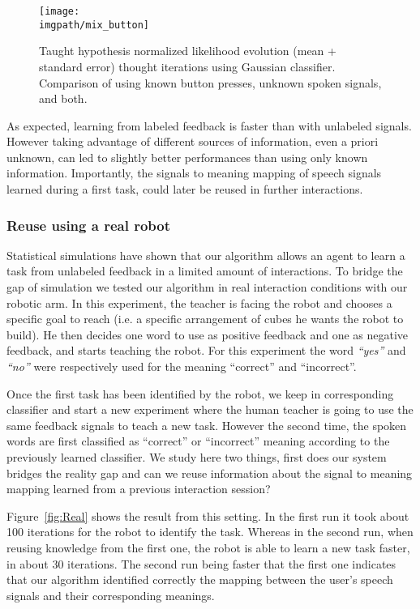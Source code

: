 \begin{figure}[!htbp]
  \centering
  \texttt{[image: \\imgpath/mix\_button]}
  \caption{Taught hypothesis normalized likelihood evolution (mean + standard error) thought iterations using Gaussian classifier. Comparison of using known button presses, unknown spoken signals, and both.}
  \label{fig:button}
\end{figure}

As expected, learning from labeled feedback is faster than with unlabeled signals. However taking advantage of different sources of information, even a priori unknown, can led to slightly better performances than using only known information. Importantly, the signals to meaning mapping of speech signals learned during a first task, could later be reused in further interactions.

\subsubsection{Reuse using a real robot}

Statistical simulations have shown that our algorithm allows an agent to learn a task from unlabeled feedback in a limited amount of interactions. To bridge the gap of simulation we tested our algorithm in real interaction conditions with our robotic arm. In this experiment, the teacher is facing the robot and chooses a specific goal to reach (i.e. a specific arrangement of cubes he wants the robot to build). He then decides one word to use as positive feedback and one as negative feedback, and starts teaching the robot. For this experiment the word \textit{``yes''} and \textit{``no''} were respectively used for the meaning ``correct'' and ``incorrect''. 

Once the first task has been identified by the robot, we keep in corresponding classifier and start a new experiment where the human teacher is going to use the same feedback signals to teach a new task. However the second time, the spoken words are first classified as ``correct'' or ``incorrect'' meaning according to the previously learned classifier. We study here two things, first does our system bridges the reality gap and can we reuse information about the signal to meaning mapping learned from a previous interaction session?

Figure~\ref{fig:Real} shows the result from this setting. In the first run it took about 100 iterations for the robot to identify the task. Whereas in the second run, when reusing knowledge from the first one, the robot is able to learn a new task faster, in about 30 iterations. The second run being faster that the first one indicates that our algorithm identified correctly the mapping between the user's speech signals and their corresponding meanings. 


